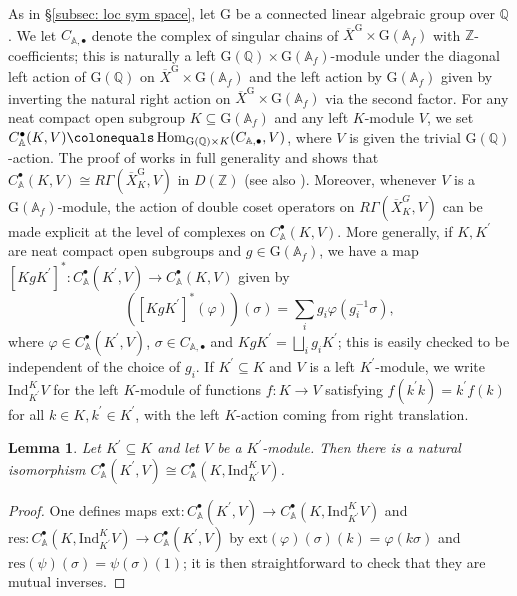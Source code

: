 \documentclass{amsart}
\newtheorem{lemma}[subsubsection]{Lemma}
\theoremstyle{remark}
\numberwithin{equation}{subsection}
\newcommand{\A}{\AA}
\newcommand{\Q}{\QQ}
\newcommand{\Z}{\ZZ}
\renewcommand{\AA}{{\mathbb A}}
\newcommand{\QQ}{{\mathbb Q}}
\newcommand{\ZZ}{{\mathbb Z}}
\DeclareMathOperator{\Hom}{Hom}
\newcommand{\ol}{\overline}
\newcommand{\sub}{\subseteq}
\newcommand{\defeq}{\colonequals}
\renewcommand{\(}{\left(}
\renewcommand{\)}{\right)}
\begin{document}
As in \S \ref{subsec: loc sym space}, let $\mathrm{G}$ be a connected linear algebraic group over $\Q$. We let $C_{\A,\bullet}$ denote the complex of singular chains of $\ol{X}^\mathrm{G} \times \mathrm{G}(\A_f)$ with $\Z$-coefficients; this is naturally a left $\mathrm{G}(\Q) \times \mathrm{G}(\A_f)$-module under the diagonal left action of $\mathrm{G}(\Q)$ on $\ol{X}^\mathrm{G} \times \mathrm{G}(\A_f)$ and the left action by $\mathrm{G}(\A_f)$ given by inverting the natural right action on $\ol{X}^\mathrm{G} \times \mathrm{G}(\A_f)$ via the second factor. For any neat compact open subgroup $K\sub \mathrm{G}(\A_f)$ and any left $K$-module $V$, we set $C_{\A}^\bullet(K,V) \defeq \Hom_{\mathrm{G}(\Q)\times K}(C_{\A,\bullet},V)$, where $V$ is given the trivial $\mathrm{G}(\Q)$-action. The proof of \cite[Proposition 6.2]{khare-thorne} works in full generality and shows that $C_{\A}^\bullet(K,V) \cong R\Gamma(\ol{X}^\mathrm{G}_K,V)$ in $D(\Z)$ (see also \cite[Proposition 2.1.]{hansen-thesis}). Moreover, whenever $V$ is a $\mathrm{G}(\A_f)$-module, the action of double coset operators on $R\Gamma(\ol{X}^G_K,V)$ can be made explicit at the level of complexes on $C_{\A}^\bullet(K,V)$. More generally, if $K,K^\prime$ are neat compact open subgroups and $g\in \mathrm{G}(\A_f)$, we have a map $[KgK^\prime]^\ast : C_{\A}^\bullet(K^\prime,V) \to C_{\A}^\bullet(K,V)$ given by 
\[
\left( [KgK^\prime]^\ast (\varphi) \right) (\sigma) = \sum_i g_i \varphi(g_i^{-1}\sigma),
\]
where $\varphi \in C_{\A}^\bullet(K^\prime,V)$, $\sigma \in C_{\A,\bullet}$ and $KgK^\prime = \bigsqcup_i g_i K^\prime$; this is easily checked to be independent of the choice of $g_i$. 
If $K^\prime \sub K$ and $V$ is a left $K^\prime$-module, we write $\mathrm{Ind}_{K^\prime}^K V$ for the left $K$-module of functions $f : K \to V$ satisfying $f(k^\prime k) = k^\prime f(k)$ for all $k\in K, k^\prime \in K^\prime$, with the left $K$-action coming from right translation.

\begin{lemma}\label{pushforward of adelic complexes}
Let $K^\prime \sub K$ and let $V$ be a $K^\prime$-module. Then there is a natural isomorphism $C_\A^\bullet(K^\prime,V) \cong C_\A^\bullet(K,\mathrm{Ind}_{K^\prime}^K V)$.
\end{lemma} 

\begin{proof}
One defines maps $\mathrm{ext} : C_\A^\bullet(K^\prime,V) \to C_\A^\bullet(K,\mathrm{Ind}_{K^\prime}^K V)$ and $\mathrm{res} : C_\A^\bullet(K,\mathrm{Ind}_{K^\prime}^K V) \to C_\A^\bullet(K^\prime, V)$ by $\mathrm{ext}(\varphi)(\sigma)(k) = \varphi(k \sigma)$ and $\mathrm{res}(\psi)(\sigma) = \psi (\sigma) (1)$; it is then straightforward to check that they are mutual inverses.
\end{proof}
\end{document}
